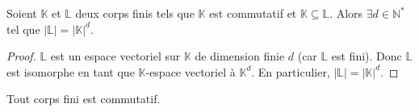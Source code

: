 






  \begin{lemma}
    \label{theoreme-de-wedderburn-1}
    Soient $\mathbb{K}$ et $\mathbb{L}$ deux corps finis tels que $\mathbb{K}$ est commutatif et $\mathbb{K} \subseteq \mathbb{L}$. Alors $\exists d \in \mathbb{N}^*$ tel que $|\mathbb{L}| = |\mathbb{K}|^d$.
  \end{lemma}

  \begin{proof}
    $\mathbb{L}$ est un espace vectoriel sur $\mathbb{K}$ de dimension finie $d$ (car $\mathbb{L}$ est fini). Donc $\mathbb{L}$ est isomorphe en tant que $\mathbb{K}$-espace vectoriel à $\mathbb{K}^d$. En particulier, $|\mathbb{L}| = |\mathbb{K}|^d$.
  \end{proof}

  \begin{theorem}
    Tout corps fini est commutatif.
  \end{theorem}

